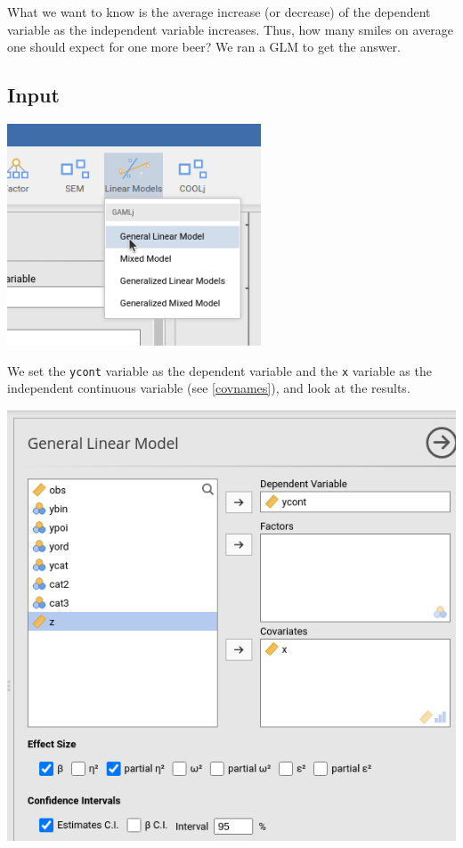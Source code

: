 \documentclass[
]{book}
\begin{document}
What we want to know is the average increase (or decrease) of the dependent variable as the independent variable increases. Thus, how many smiles on average one should expect for one more beer? We ran a GLM to get the answer.

\hypertarget{glminput}{%
\subsection{Input}\label{glminput}}

\includegraphics[width=0.9\linewidth]{bookletpics/2_menu1}

We set the \texttt{ycont} variable as the dependent variable and the \texttt{x} variable as the independent continuous variable (see \ref{covnames}), and look at the results.

\includegraphics[width=0.9\linewidth]{bookletpics/2_input1}
\end{document}
